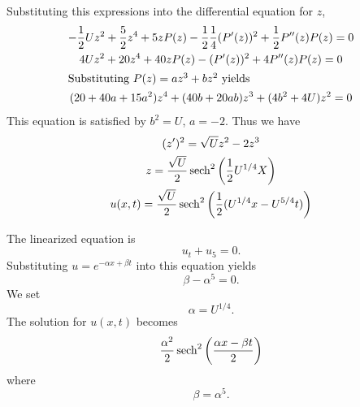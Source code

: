 \begin{Solution}
\begin{enumerate}
    Substituting this expressions into the differential equation for $z$,
    \begin{gather*}
      -\frac{1}{2} U z^2 + \frac{5}{2} z^4 + 5 z P(z) - \frac{1}{2} \frac{1}{4}
      (P'(z))^2 + \frac{1}{2} P''(z) P(z) = 0 \\
      4 U z^2 + 20 z^4 + 40 z P(z) - (P'(z))^2 + 4 P''(z) P(z) = 0 \\
      \intertext{Substituting $P(z) = a z^3 + b z^2$ yields}
      (20 + 40 a + 15 a^2) z^4 + (40 b + 20 a b) z^3 + 
      (4b^2 + 4 U)z^2 = 0 
    \end{gather*}
    This equation is satisfied by $b^2 = U$, $a = -2$.  Thus we have
    \begin{gather*}
      (z')^2 = \sqrt{U} z^2 - 2 z^3 \\
      z = \frac{\sqrt{U}}{2} \mathop{\mathrm{sech}}\nolimits^2 \left( \frac{1}{2} U^{1/4} X \right) \\
      u(x,t) = \frac{\sqrt{U}}{2} \mathop{\mathrm{sech}}\nolimits^2 \left( \frac{1}{2} (U^{1/4} x 
        - U^{5/4} t) \right)
    \end{gather*}

    The linearized equation is
    \[u_t + u_5 = 0. \]
    Substituting $u = e^{-\alpha x + \beta t}$ into this equation yields
    \[ \beta - \alpha^5 = 0. \]
    We set 
    \[ \alpha = U^{1/4}. \]
    The solution for $u(x,t)$ becomes
    \[ \frac{\alpha^2}{2} \mathop{\mathrm{sech}}\nolimits^2\left( \frac{\alpha x - \beta t}{2} \right) \]
    where 
    \[ \beta = \alpha^5. \]
  \end{enumerate}
\end{Solution}






\raggedbottom







